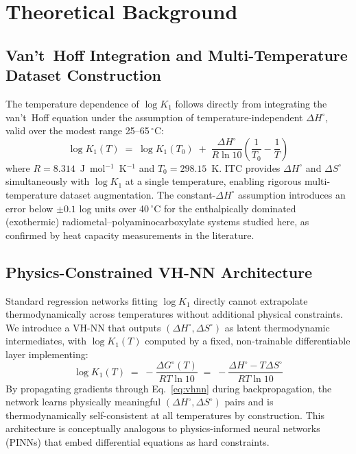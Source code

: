 \documentclass[journal=jacsat,manuscript=article]{achemso}
\begin{document}
\section{Theoretical Background}

\subsection{Van't~Hoff Integration and Multi-Temperature Dataset Construction}
\label{sec:vanthoff_theory}

The temperature dependence of $\log K_1$ follows directly from integrating the
van't~Hoff equation under the assumption of temperature-independent $\Delta H^\circ$,
valid over the modest range 25--65\,$^\circ$C:\cite{Leavitt2001}
\begin{equation}
  \log K_1(T) \;=\; \log K_1(T_0)
    \;+\; \frac{\Delta H^\circ}{R \ln 10}
    \left(\frac{1}{T_0} - \frac{1}{T}\right)
  \label{eq:vant_hoff}
\end{equation}
where $R = 8.314$~J~mol$^{-1}$~K$^{-1}$ and $T_0 = 298.15$~K.
ITC provides $\Delta H^\circ$ and $\Delta S^\circ$ simultaneously with $\log K_1$
at a single temperature, enabling rigorous multi-temperature dataset augmentation.\cite{Leavitt2001}
The constant-$\Delta H^\circ$ assumption introduces an error below
$\pm 0.1$ log units over 40\,$^\circ$C for the enthalpically dominated
(exothermic) radiometal--polyaminocarboxylate systems studied here,
as confirmed by heat capacity measurements in the literature.\cite{Blei2023,Notni2010}

\subsection{Physics-Constrained VH-NN Architecture}

Standard regression networks fitting $\log K_1$ directly cannot extrapolate
thermodynamically across temperatures without additional physical constraints.
We introduce a VH-NN that outputs $(\Delta H^\circ, \Delta S^\circ)$ as latent
thermodynamic intermediates, with $\log K_1(T)$ computed by a fixed, non-trainable
differentiable layer implementing:
\begin{equation}
  \log K_1(T) \;=\; -\frac{\Delta G^\circ(T)}{RT \ln 10}
    \;=\; -\frac{\Delta H^\circ - T\Delta S^\circ}{RT \ln 10}
  \label{eq:vhnn}
\end{equation}
By propagating gradients through Eq.~\ref{eq:vhnn} during backpropagation, the
network learns physically meaningful $(\Delta H^\circ, \Delta S^\circ)$ pairs
and is thermodynamically self-consistent at all temperatures by construction.
This architecture is conceptually analogous to physics-informed neural networks
(PINNs) that embed differential equations as hard constraints.\cite{Karunaratne2025}
\end{document}
